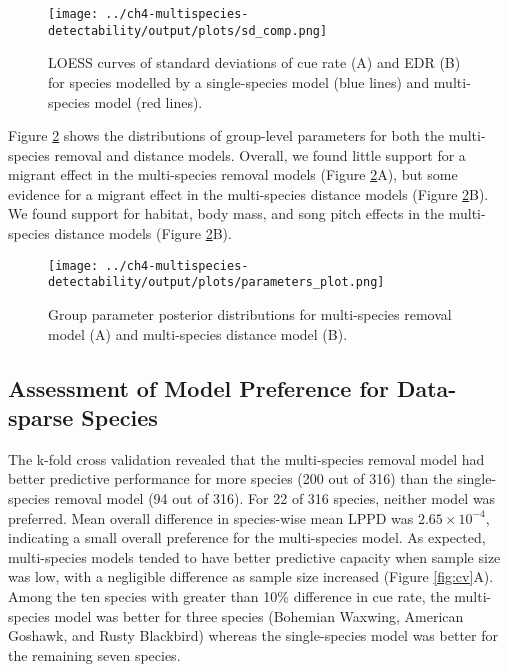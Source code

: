 \begin{figure}[h]
	\texttt{[image: ../ch4-multispecies-detectability/output/plots/sd\_comp.png]}
	\caption{LOESS curves of standard deviations of cue rate (A) and EDR (B) for species modelled by a single-species model (blue lines) and multi-species model (red lines).}
	\label{fig:sd}
\end{figure}

\par Figure \ref{fig:params} shows the distributions of group-level parameters for both the multi-species removal and distance models. 
Overall, we found little support for a migrant effect in the multi-species removal models (Figure \ref{fig:params}A), but some evidence for a migrant effect in the multi-species distance models (Figure \ref{fig:params}B).
We found support for habitat, body mass, and song pitch effects in the multi-species distance models (Figure \ref{fig:params}B).

\begin{figure}[h]
	\texttt{[image: ../ch4-multispecies-detectability/output/plots/parameters\_plot.png]}
	\caption{Group parameter posterior distributions for multi-species removal model (A) and multi-species distance model (B).}
	\label{fig:params}
\end{figure}

\subsection{Assessment of Model Preference for Data-sparse Species}

\par The k-fold cross validation revealed that the multi-species removal model had better predictive performance for more species (200 out of 316) than the single-species removal model (94 out of 316).
For 22 of 316 species, neither model was preferred.
Mean overall difference in species-wise mean LPPD was $2.65 \times 10^{-4}$, indicating a small overall preference for the multi-species model.
As expected, multi-species models tended to have better predictive capacity when sample size was low, with a negligible difference as sample size increased (Figure \ref{fig:cv}A).
Among the ten species with greater than 10\% difference in cue rate, the multi-species model was better for three species (Bohemian Waxwing, American Goshawk, and Rusty Blackbird) whereas the single-species model was better for the remaining seven species.

